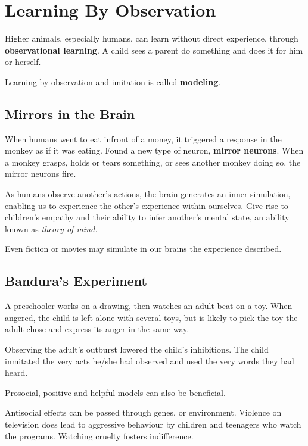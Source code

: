 \documentclass[12pt]{article}
\begin{document}
\section*{Learning By Observation}
Higher animals, especially humans, can learn without direct experience, through \textbf{observational learning}. A child sees a parent do something and does it for him or herself.

Learning by observation and imitation is called \textbf{modeling}. 

\subsection*{Mirrors in the Brain}
When humans went to eat infront of a money, it triggered a response in the monkey as if it was eating. Found a new type of neuron, \textbf{mirror neurons}. When a monkey grasps, holds or tears something, or sees another monkey doing so, the mirror neurons fire.

As humans observe another's actions, the brain generates an inner simulation, enabling us to experience the other's experience within ourselves. Give rise to children's empathy and their ability to infer another's mental state, an ability known as \textit{theory of mind.} 

Even fiction or movies may simulate in our brains the experience described.

\subsection*{Bandura's Experiment}
A preschooler works on a drawing, then watches an adult beat on a toy. When angered, the child is left alone with several toys, but is likely to pick the toy the adult chose and express its anger in the same way. 

Observing the adult's outburst lowered the child's inhibitions. The child inmitated the very acts he/she had observed and used the very words they had heard.

Prosocial, positive and helpful models can also be beneficial. 

Antisocial effects can be passed through genes, or environment. Violence on television does lead to aggressive behaviour by children and teenagers who watch the programs. Watching cruelty fosters indifference.
\end{document}
